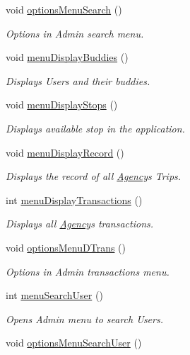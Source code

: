 \begin{Indent}
\begin{DoxyCompactItemize}
void \hyperlink{group___agency_ga4b51dfec7cdca417730d613ef5ec1d42}{options\+Menu\+Search} ()
\begin{DoxyCompactList}\small\item\em Options in Admin search menu. \end{DoxyCompactList}\item 
void \hyperlink{group___agency_ga6ff3272c35880d3a599fe3ebb6ef3280}{menu\+Display\+Buddies} ()
\begin{DoxyCompactList}\small\item\em Displays Users and their buddies. \end{DoxyCompactList}\item 
void \hyperlink{group___agency_ga5551ae0256b60e7279a8673c7f1b6121}{menu\+Display\+Stops} ()
\begin{DoxyCompactList}\small\item\em Displays available stop in the application. \end{DoxyCompactList}\item 
void \hyperlink{group___agency_gae4890fb51527fa95db0e22780f867ecf}{menu\+Display\+Record} ()
\begin{DoxyCompactList}\small\item\em Displays the record of all \hyperlink{class_agency}{Agency}\textquotesingle{}s Trips. \end{DoxyCompactList}\item 
int \hyperlink{group___agency_ga2c99075b9ec8cb23e2e7974dba44161d}{menu\+Display\+Transactions} ()
\begin{DoxyCompactList}\small\item\em Displays all \hyperlink{class_agency}{Agency}\textquotesingle{}s transactions. \end{DoxyCompactList}\item 
void \hyperlink{group___agency_gae7adf6319525f61d71e1ec46c2fb3659}{options\+Menu\+D\+Trans} ()
\begin{DoxyCompactList}\small\item\em Options in Admin transactions menu. \end{DoxyCompactList}\item 
int \hyperlink{group___agency_gac3966e479d0ff814b7811edcaa6ea449}{menu\+Search\+User} ()
\begin{DoxyCompactList}\small\item\em Opens Admin menu to search Users. \end{DoxyCompactList}\item 
void \hyperlink{group___agency_ga15abca6e47057fac90682e8b0317322c}{options\+Menu\+Search\+User} ()

\end{DoxyCompactItemize}
\end{Indent}
